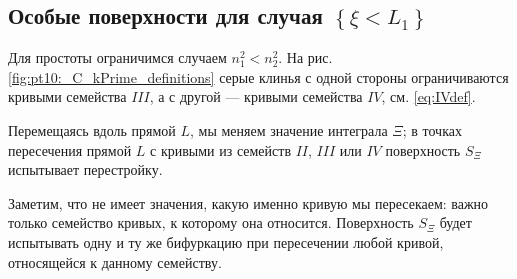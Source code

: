 \subsection{Особые поверхности для случая $\left\{ \xi < L_1 \right\}$}\label{sec:ch4/sec3/subsec10}
Для простоты ограничимся случаем  $n_1^2 < n_2^2$. 
На рис. \ref{fig:pt10:_C_kPrime_definitions} серые клинья с одной стороны ограничиваются кривыми семейства $III$, а с другой --- кривыми семейства $IV$, см. \eqref{eq:IVdef}.

Перемещаясь вдоль прямой $L$, мы меняем значение интеграла $\Xi$; в точках пересечения прямой $L$ с кривыми  из семейств $II$, $III$ или $IV$ поверхность $S_\Xi$ испытывает перестройку.

Заметим, что не имеет значения, какую  именно кривую мы пересекаем: важно только семейство кривых, к которому она относится. Поверхность $S_\Xi$ будет испытывать одну и ту же бифуркацию при пересечении любой кривой, относящейся к данному семейству.
 
